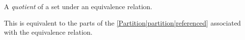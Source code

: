 

A \emph{quotient} of a set under an equivalence relation.

This is equivalent to the parts of the \ref{Partition|partition|referenced} associated with the equivalence relation.
